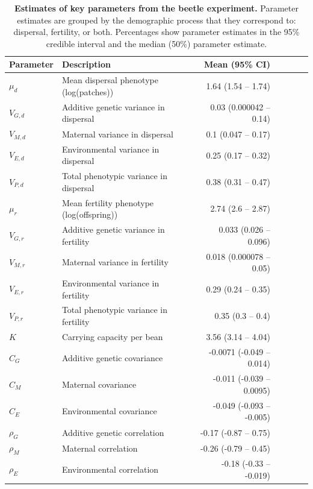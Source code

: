 \documentclass[11pt]{article}
\begin{document}
\renewcommand{\thetable}{\arabic{table}}
\setcounter{table}{0}

\newpage{}
\begin{table}[h]
\centering
\label{Estimates of key parameters from the beetle experiment}
\caption[Estimates of key parameters from the beetle experiment]{\textbf{Estimates of key parameters from the beetle experiment.} Parameter estimates are grouped by the demographic process that they correspond to: dispersal, fertility, or both. Percentages show parameter estimates in the 95\% credible interval and the median (50\%) parameter estimate.}\label{corr:estimates}\vspace{0.1in}
\begin{tabularx}{0.95\linewidth}{lXrrrrr}
\toprule
Parameter   & Description                               & Mean (95\% CI) \\ \midrule
$\mu_{d}$   & Mean dispersal phenotype (log(patches)) & 1.64 (1.54 -- 1.74) \\
$V_{G,d}$   & Additive genetic variance in dispersal &  0.03 (0.000042 -- 0.14)  \\
$V_{M,d}$   & Maternal variance in dispersal    &  0.1 (0.047 -- 0.17)  \\ 
$V_{E,d}$   & Environmental variance in dispersal  &  0.25 (0.17 -- 0.32)  \\ 
$V_{P,d}$   & Total phenotypic variance in dispersal  &  0.38 (0.31 -- 0.47)  \\ \midrule
$\mu_{r}$   & Mean fertility phenotype (log(offspring)) &  2.74 (2.6 -- 2.87)  \\
$V_{G,r}$   & Additive genetic variance in fertility &  0.033 (0.026 -- 0.096)  \\
$V_{M,r}$   & Maternal variance in fertility &  0.018 (0.000078 -- 0.05)  \\
$V_{E,r}$   & Environmental variance in fertility    &  0.29 (0.24 -- 0.35) \\
$V_{P,r}$   & Total phenotypic variance in fertility    &  0.35 (0.3 -- 0.4) \\
$K$         & Carrying capacity per bean   &  3.56 (3.14 -- 4.04)  \\ \midrule
$C_{G}$     & Additive genetic covariance &  -0.0071 (-0.049 -- 0.014) \\
$C_{M}$     & Maternal covariance & -0.011 (-0.039 -- 0.0095) \\
$C_{E}$     & Environmental covariance   & -0.049 (-0.093 -- -0.005)  \\
$\rho_{G}$  & Additive genetic correlation  &  -0.17 (-0.87 -- 0.75)\\
$\rho_{M}$  & Maternal correlation  &  -0.26 (-0.79 -- 0.45) \\
$\rho_{E}$  & Environmental correlation     &  -0.18 (-0.33 -- -0.019) \\
\bottomrule
\end{tabularx}
\end{table}
\end{document}
